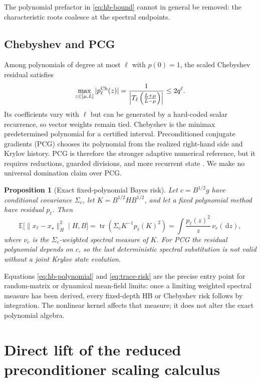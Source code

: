 \documentclass[11pt,a4paper]{article}
\numberwithin{equation}{section}
\newtheorem{proposition}[theorem]{Proposition}
\theoremstyle{definition}
\theoremstyle{remark}
\newcommand{\E}{\mathbb E}
\newcommand{\tr}{\operatorname{tr}}
\newcommand{\dd}{\,\mathrm d}
\begin{document}
The polynomial prefactor in \eqref{eq:hb-bound} cannot in general be removed:
the characteristic roots coalesce at the spectral endpoints.

\subsection{Chebyshev and PCG}

Among polynomials of degree at most $\ell$ with $p(0)=1$, the scaled
Chebyshev residual satisfies
\begin{equation}
 \max_{z\in[\mu,L]}|p_\ell^{\rm Ch}(z)|
 =\frac{1}{\left|T_\ell\left(\frac{L+\mu}{L-\mu}\right)\right|}
 \le 2q^\ell.
 \label{eq:chebyshev-bound}
\end{equation}
Its coefficients vary with $\ell$ but can be generated by a hard-coded scalar
recurrence, so vector weights remain tied.  Chebyshev is the minimax
predetermined polynomial for a certified interval.  Preconditioned conjugate
gradients (PCG) chooses its polynomial from the realized right-hand side and
Krylov history.  PCG is therefore the stronger adaptive numerical reference,
but it requires reductions, guarded divisions, and more recurrent state
\citep{saad2003iterative}.  We make no universal domination claim over PCG.

\begin{proposition}[Exact fixed-polynomial Bayes risk]
\label{prop:trace-risk}
Let $c=B^{1/2}g$ have conditional covariance $\Sigma_c$, let
$K=B^{1/2}HB^{1/2}$, and let a fixed polynomial method have residual
$p_\ell$.  Then
\begin{equation}
 \E\bigl[\|x_\ell-x_\star\|_H^2\mid H,B\bigr]
 =\tr\!\left(\Sigma_cK^{-1}p_\ell(K)^2\right)
 =\int\frac{p_\ell(z)^2}{z}\,\nu_c(\dd z),
 \label{eq:trace-risk}
\end{equation}
where $\nu_c$ is the $\Sigma_c$-weighted spectral measure of $K$.
For PCG the residual polynomial depends on $c$, so the last deterministic
spectral substitution is not valid without a joint Krylov state evolution.
\end{proposition}

Equations \eqref{eq:hb-polynomial} and \eqref{eq:trace-risk} are the precise
entry point for random-matrix or dynamical mean-field limits: once a limiting
weighted spectral measure has been derived, every fixed-depth HB or Chebyshev
risk follows by integration.  The nonlinear kernel affects that measure; it
does not alter the exact polynomial algebra.

\section{Direct lift of the reduced preconditioner scaling calculus}
\label{sec:gamma-lift}
\end{document}
